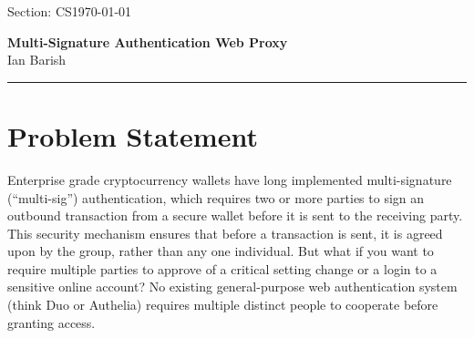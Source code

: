 \documentclass[12pt]{article}
\newcommand{\Section}{CS}                        %
\newcommand{\ProjectTitle}{Multi-Signature Authentication Web Proxy}
\newcommand{\AuthorName}{Ian Barish}
\newcommand{\ReportDate}{\today}
\begin{document}
\noindent Section: \Section \hfill \ReportDate \\[0.2em]
\begin{center}
  {\large \textbf{\ProjectTitle}} \\[0.3em]
  \AuthorName
\end{center}

\noindent\rule{\linewidth}{0.4pt}






\section{Problem Statement}

Enterprise grade cryptocurrency wallets have long implemented multi-signature (``multi-sig'') authentication, which requires two or more parties to sign an outbound transaction from a secure wallet before it is sent to the receiving party. This security mechanism ensures that before a transaction is sent, it is agreed upon by the group, rather than any one individual. But what if you want to require multiple parties to approve of a critical setting change or a login to a sensitive online account? No existing general-purpose web authentication system (think Duo or Authelia) requires multiple distinct people to cooperate before granting access.
\end{document}
